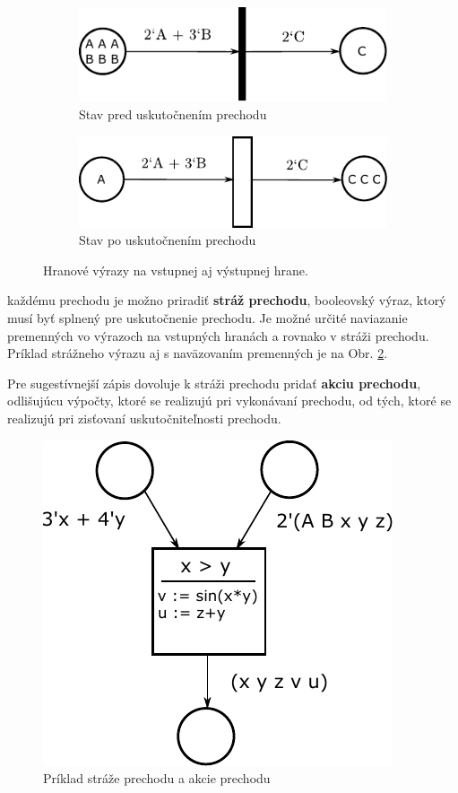 \begin{figure}[H]
	\centering
	\begin{subfigure}[t]{0.4\textwidth}
		\centering
		\includegraphics[scale=0.75]{obrazky-figures/PN-edge-expr}
		\caption{Stav pred uskutočnením prechodu}
	\end{subfigure}
	\begin{subfigure}[t]{0.4\textwidth}
		\centering
		\includegraphics[scale=0.75]{obrazky-figures/PN-edge-exprR}
		\caption{Stav po uskutočnením prechodu}
	\end{subfigure}
	\caption{Hranové výrazy na vstupnej aj výstupnej hrane.}
	\label{fig:edge-expr}
\end{figure}
každému prechodu je možno priradiť \textbf{stráž prechodu}, booleovský výraz, ktorý musí byť splnený pre uskutočnenie prechodu. Je možné určité naviazanie
premenných vo výrazoch na vstupných hranách a rovnako v stráži prechodu. Príklad strážneho výrazu  aj s naväzovaním premenných je na Obr. \ref{fig:guard}.

Pre sugestívnejší zápis dovoluje k stráži prechodu pridať \textbf{akciu prechodu}, odlišujúcu výpočty, ktoré se realizujú pri vykonávaní prechodu, od tých, ktoré se realizujú pri zisťovaní uskutočniteľnosti prechodu.

\begin{figure}[H]
	\centering
	\includegraphics[scale=0.75]{obrazky-figures/PN-guard}
	\caption{Príklad stráže prechodu a akcie prechodu}
	\label{fig:guard}
\end{figure}

